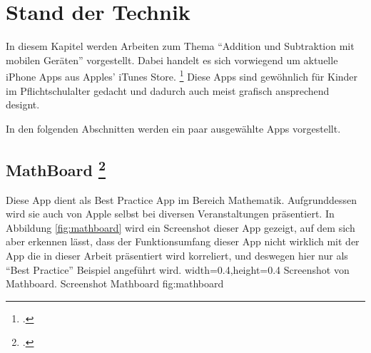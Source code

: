 

\chapter{Stand der Technik}
\label{chap:sota}

In diesem Kapitel werden Arbeiten zum Thema 
\enquote{Addition und Subtraktion mit mobilen Geräten} vorgestellt.
Dabei handelt es sich vorwiegend um aktuelle iPhone Apps aus 
Apples' iTunes Store. \footcite{https://itunes.apple.com/de/genre/ios/id36?mt=8} Diese Apps sind 
gewöhnlich für Kinder im Pflichtschulalter gedacht und dadurch auch meist grafisch ansprechend 
designt.

In den folgenden Abschnitten werden ein paar ausgewählte Apps vorgestellt.

\section{MathBoard \footcite{https://itunes.apple.com/de/app/mathboard/id373909837?mt=8}}
Diese App dient als Best Practice App im Bereich Mathematik. Aufgrunddessen wird sie 
auch von Apple selbst bei diversen Veranstaltungen präsentiert. In Abbildung \ref{fig:mathboard} 
wird ein Screenshot dieser App gezeigt, auf dem sich aber erkennen lässt, dass der Funktionsumfang dieser App 
nicht wirklich mit der App die in dieser Arbeit präsentiert wird korreliert, und deswegen hier nur
als \enquote{Best Practice} Beispiel angeführt wird.
  {width=0.4\textwidth,height=0.4\textheight}%
  {Screenshot von Mathboard.}%
  {Screenshot Mathboard}%
  {fig:mathboard}%


